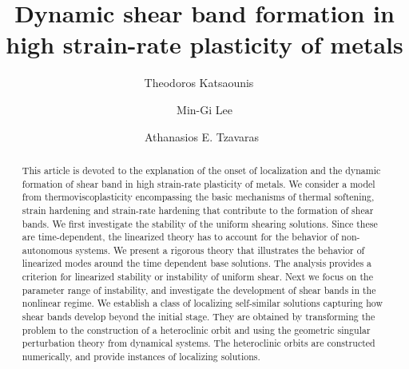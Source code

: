 \documentclass[a4paper,11pt]{article}
\theoremstyle{remark}
\begin{document}
\title{Dynamic shear band formation in high strain-rate plasticity of metals}
\author{Theodoros Katsaounis\footnotemark[1]\ \footnotemark[2]\ \footnotemark[3]
\and Min-Gi Lee\footnotemark[1]
\and Athanasios E. Tzavaras\footnotemark[1]\  \footnotemark[4]}
\date{}

\maketitle
\renewcommand{\thefootnote}{\fnsymbol{footnote}}
\renewcommand{\thefootnote}{\arabic{footnote}}

 \begin{abstract}
 This article is devoted to the explanation of the onset of localization and the dynamic formation of shear band in high strain-rate plasticity of metals. 
 We consider a model from thermoviscoplasticity encompassing the basic mechanisms of thermal softening, strain hardening and strain-rate hardening 
 that contribute to the formation of shear bands. We first investigate the stability of the uniform shearing solutions.
 Since these are time-dependent, the linearized theory has to account for the behavior of  non-autonomous systems.
 We present a rigorous theory that illustrates the behavior of  linearized modes around the time dependent base solutions. 
 The analysis provides a criterion for linearized stability or instability of uniform shear. Next we focus on the parameter range of instability,
 and investigate the development of shear bands in the nonlinear regime. We establish a class of localizing self-similar solutions 
 capturing  how shear bands develop beyond the initial stage. They are obtained by transforming the problem to the construction
 of a heteroclinic orbit and using the geometric singular perturbation theory from dynamical systems. 
 The heteroclinic orbits are constructed numerically, and provide instances of  localizing solutions.
 \end{abstract}
\end{document}

